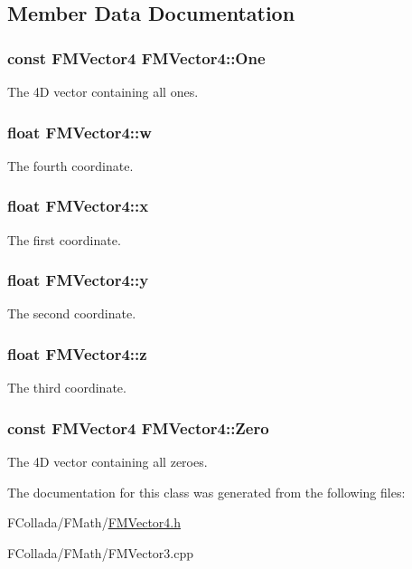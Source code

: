 \subsection{Member Data Documentation}
\hypertarget{classFMVector4_ae76b0f45630d1c2ff5f14409c15357ac}{
\subsubsection[{One}]{\setlength{\rightskip}{0pt plus 5cm}const {\bf FMVector4} {\bf FMVector4::One}}}
\label{classFMVector4_ae76b0f45630d1c2ff5f14409c15357ac}
The 4D vector containing all ones. \hypertarget{classFMVector4_a38311f6dd1139e792d6fad137572a82a}{
\subsubsection[{w}]{\setlength{\rightskip}{0pt plus 5cm}float {\bf FMVector4::w}}}
\label{classFMVector4_a38311f6dd1139e792d6fad137572a82a}
The fourth coordinate. \hypertarget{classFMVector4_afe5d4e4d762d99547c6c4ba2e2f336db}{
\subsubsection[{x}]{\setlength{\rightskip}{0pt plus 5cm}float {\bf FMVector4::x}}}
\label{classFMVector4_afe5d4e4d762d99547c6c4ba2e2f336db}
The first coordinate. \hypertarget{classFMVector4_a36567c972039925e7ee11faa69ddd5ab}{
\subsubsection[{y}]{\setlength{\rightskip}{0pt plus 5cm}float {\bf FMVector4::y}}}
\label{classFMVector4_a36567c972039925e7ee11faa69ddd5ab}
The second coordinate. \hypertarget{classFMVector4_aa86685f8bdb9b6ce80edd1b4424475b8}{
\subsubsection[{z}]{\setlength{\rightskip}{0pt plus 5cm}float {\bf FMVector4::z}}}
\label{classFMVector4_aa86685f8bdb9b6ce80edd1b4424475b8}
The third coordinate. \hypertarget{classFMVector4_a98ad0940dc7826de03de889f947a3ef6}{
\subsubsection[{Zero}]{\setlength{\rightskip}{0pt plus 5cm}const {\bf FMVector4} {\bf FMVector4::Zero}}}
\label{classFMVector4_a98ad0940dc7826de03de889f947a3ef6}
The 4D vector containing all zeroes. 

The documentation for this class was generated from the following files:\begin{DoxyCompactItemize}
\item 
FCollada/FMath/\hyperlink{FMVector4_8h}{FMVector4.h}\item 
FCollada/FMath/FMVector3.cpp\end{DoxyCompactItemize}
